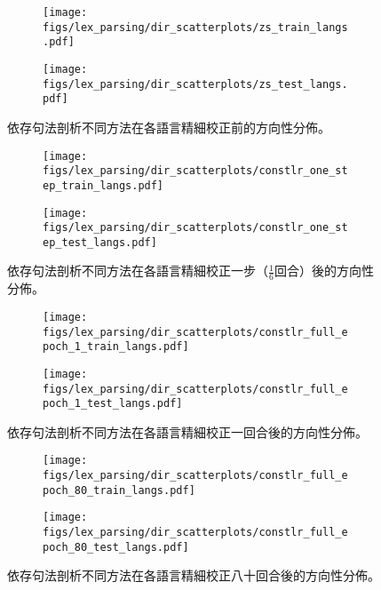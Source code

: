 \begin{figure}[htbp]
    \centering
    \begin{subfigure}[t]{0.7\textwidth}
        \centering
        \texttt{[image: figs/lex\_parsing/dir\_scatterplots/zs\_train\_langs.pdf]}
    \end{subfigure}
    \vspace{-12pt}
    \begin{subfigure}[t]{0.7\textwidth}
        \centering
        \texttt{[image: figs/lex\_parsing/dir\_scatterplots/zs\_test\_langs.pdf]}
    \end{subfigure}
    \caption{依存句法剖析不同方法在各語言精細校正前的方向性分佈。}
    \label{fig:lex_dir_scatter_zs}
\end{figure}
\begin{figure}[htbp]
    \centering
    \begin{subfigure}[t]{0.7\textwidth}
        \centering
        \texttt{[image: figs/lex\_parsing/dir\_scatterplots/constlr\_one\_step\_train\_langs.pdf]}
    \end{subfigure}
    \vspace{-12pt}
    \begin{subfigure}[t]{0.7\textwidth}
        \centering
        \texttt{[image: figs/lex\_parsing/dir\_scatterplots/constlr\_one\_step\_test\_langs.pdf]}
    \end{subfigure}
    \caption{依存句法剖析不同方法在各語言精細校正一步（$\frac{1}{6}$回合）後的方向性分佈。}
    \label{fig:lex_dir_scatter_one_step}
\end{figure}
\begin{figure}[htbp]
    \centering
    \begin{subfigure}[t]{0.7\textwidth}
        \centering
        \texttt{[image: figs/lex\_parsing/dir\_scatterplots/constlr\_full\_epoch\_1\_train\_langs.pdf]}
    \end{subfigure}
    \vspace{-12pt}
    \begin{subfigure}[t]{0.7\textwidth}
        \centering
        \texttt{[image: figs/lex\_parsing/dir\_scatterplots/constlr\_full\_epoch\_1\_test\_langs.pdf]}
    \end{subfigure}
    \caption{依存句法剖析不同方法在各語言精細校正一回合後的方向性分佈。}
    \label{fig:lex_dir_scatter_full_epoch_1}
\end{figure}
\begin{figure}[htbp]
    \centering
    \begin{subfigure}[t]{0.7\textwidth}
        \centering
        \texttt{[image: figs/lex\_parsing/dir\_scatterplots/constlr\_full\_epoch\_80\_train\_langs.pdf]}
    \end{subfigure}
    \vspace{-12pt}
    \begin{subfigure}[t]{0.7\textwidth}
        \centering
        \texttt{[image: figs/lex\_parsing/dir\_scatterplots/constlr\_full\_epoch\_80\_test\_langs.pdf]}
    \end{subfigure}
    \caption{依存句法剖析不同方法在各語言精細校正八十回合後的方向性分佈。}
    \label{fig:lex_dir_scatter_full_epoch_80}
\end{figure}
